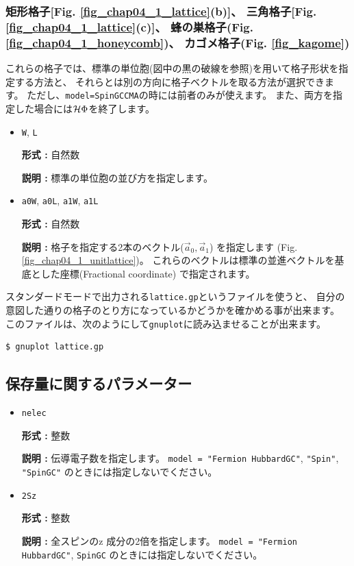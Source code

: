 \subsubsection{矩形格子[Fig. \ref{fig_chap04_1_lattice}(b)]、 
三角格子[Fig. \ref{fig_chap04_1_lattice}(c)]、
蜂の巣格子(Fig. \ref{fig_chap04_1_honeycomb})、
カゴメ格子(Fig. \ref{fig_kagome})}

これらの格子では、標準の単位胞(図中の黒の破線を参照)を用いて格子形状を指定する方法と、
それらとは別の方向に格子ベクトルを取る方法が選択できます。
ただし、\verb|model=SpinGCCMA|の時には前者のみが使えます。
また、両方を指定した場合には$\mathcal{H} \Phi$を終了します。

\begin{itemize}

\item \verb|W|, \verb|L|

{\bf 形式 :} 自然数

{\bf 説明 :} 標準の単位胞の並び方を指定します。

\item \verb|a0W|, \verb|a0L|, \verb|a1W|, \verb|a1L|

{\bf 形式 :} 自然数

{\bf 説明 :} 格子を指定する2本のベクトル(${\vec a}_0, {\vec a}_1$)
を指定します (Fig. \ref{fig_chap04_1_unitlattice})。
これらのベクトルは標準の並進ベクトルを基底とした座標(Fractional coordinate)
で指定されます。

\end{itemize}

スタンダードモードで出力される\verb|lattice.gp|というファイルを使うと、
自分の意図した通りの格子のとり方になっているかどうかを確かめる事が出来ます。
このファイルは、次のようにして\verb|gnuplot|に読み込ませることが出来ます。
\begin{verbatim}
$ gnuplot lattice.gp
\end{verbatim}


\subsection{保存量に関するパラメーター}

\begin{itemize}
\item \verb|nelec|

{\bf 形式 :} 整数

{\bf 説明 :} 伝導電子数を指定します。
\verb|model = "Fermion HubbardGC"|, \verb|"Spin"|, \verb|"SpinGC"|
のときには指定しないでください。

\item \verb|2Sz|

{\bf 形式 :} 整数

{\bf 説明 :} 全スピンのz 成分の2倍を指定します。
\verb|model = "Fermion HubbardGC"|, \verb|SpinGC|
のときには指定しないでください。
\end{itemize}

